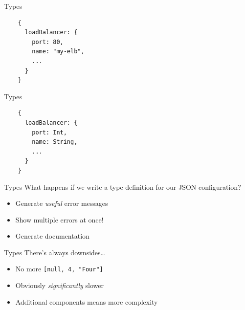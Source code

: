 \documentclass[aspectratio=169,20pt]{beamer}
\newcommand{\vspaced}{
    \vspace{5mm}
}
\begin{document}
\begin{frame}[fragile]{Types}
    \begin{lstlisting}
    {
      loadBalancer: {
        port: 80,
        name: "my-elb",
        ...
      }
    }
    \end{lstlisting}
\end{frame}

\begin{frame}[fragile]{Types}
    \begin{lstlisting}
    {
      loadBalancer: {
        port: Int,
        name: String,
        ...
      }
    }
    \end{lstlisting}
\end{frame}

\begin{frame}{Types}
    What happens if we write a type definition for our JSON configuration? \\
    \vspaced
    \begin{itemize}
    \item Generate \emph{useful} error messages
    \item Show multiple errors at once!
    \item Generate documentation
    \end{itemize}
\end{frame}

\begin{frame}{Types}
    There's always downsides\ldots
    \vspaced
    \begin{itemize}
    \item No more \texttt{[null, 4, "Four"]}
    \item Obviously \emph{significantly} slower
    \item Additional components means more complexity
    \end{itemize}
\end{frame}
\end{document}

